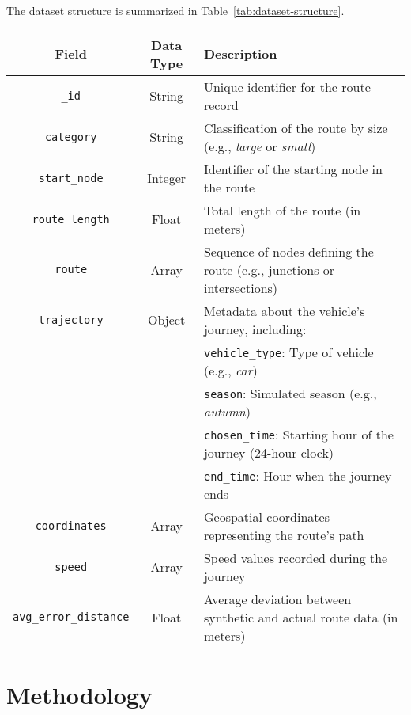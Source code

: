 \documentclass[sigplan,screen]{acmart}
\begin{document}
The dataset structure is summarized in Table~\ref{tab:dataset-structure}.

\begin{table*}[h!]
\centering
\caption{Structure of the Dataset}
\label{tab:dataset-structure}
\begin{tabular}{|c|c|l|}
\hline
\textbf{Field} & \textbf{Data Type} & \textbf{Description} \\ \hline
\texttt{\_id} & String & Unique identifier for the route record \\ \hline
\texttt{category} & String & Classification of the route by size (e.g., \textit{large} or \textit{small}) \\ \hline
\texttt{start\_node} & Integer & Identifier of the starting node in the route \\ \hline
\texttt{route\_length} & Float & Total length of the route (in meters) \\ \hline
\texttt{route} & Array & Sequence of nodes defining the route (e.g., junctions or intersections) \\ \hline
\texttt{trajectory} & Object & Metadata about the vehicle's journey, including: \\
& & \hspace{1em} \texttt{vehicle\_type}: Type of vehicle (e.g., \textit{car}) \\
& & \hspace{1em} \texttt{season}: Simulated season (e.g., \textit{autumn}) \\
& & \hspace{1em} \texttt{chosen\_time}: Starting hour of the journey (24-hour clock) \\
& & \hspace{1em} \texttt{end\_time}: Hour when the journey ends \\ \hline
\texttt{coordinates} & Array & Geospatial coordinates representing the route's path \\ \hline
\texttt{speed} & Array & Speed values recorded during the journey \\ \hline
\texttt{avg\_error\_distance} & Float & Average deviation between synthetic and actual route data (in meters) \\ \hline
\end{tabular}
\end{table*}

\section{Methodology}
\end{document}
